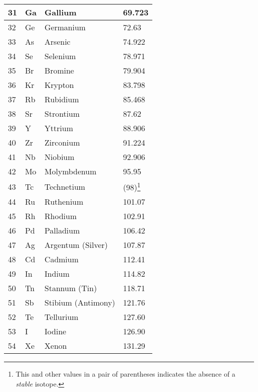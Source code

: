 \documentclass{article}
\begin{document}
\begin{center}
\begin{longtable}{|l|l|l|l|}
 \hline
    31 & Ga & \cellcolor{postblue}Gallium & 69.723\\
 \hline
    32 & Ge & \cellcolor{metalloid}Germanium & 72.63\\
 \hline
    33 & As & \cellcolor{metalloid}Arsenic & 74.922\\
 \hline
    34 & Se & \cellcolor{rnmgreen}Selenium & 78.971\\
 \hline
    35 & Br & \cellcolor{rnmgreen}Bromine & 79.904\\
 \hline
    36 & Kr &\cellcolor{noblepink}Krypton & 83.798\\
 \hline
 \hline
    37 & Rb & \cellcolor{alkalibeige}Rubidium & 85.468\\
 \hline
    38 & Sr & \cellcolor{alkalineyellow}Strontium & 87.62\\
 \hline
    39 & Y & \cellcolor{transred}Yttrium & 88.906\\
 \hline
    40 & Zr & \cellcolor{transred}Zirconium & 91.224\\
 \hline
    41 & Nb & \cellcolor{transred}Niobium & 92.906\\
 \hline
    42 & Mo & \cellcolor{transred}Molymbdenum & 95.95\\
 \hline
    43 & Tc & \cellcolor{transred}Technetium & (98)\footnote{This and other values in a pair of parentheses indicates the absence of a \emph{stable} isotope.}\\
 \hline
    44 & Ru & \cellcolor{transred}Ruthenium & 101.07\\
 \hline
    45 & Rh & \cellcolor{transred}Rhodium & 102.91\\
 \hline
    46 & Pd & \cellcolor{transred}Palladium & 106.42\\
 \hline
    47 & Ag & \cellcolor{transred}Argentum (Silver) & 107.87\\
 \hline
    48 & Cd & \cellcolor{transred}Cadmium & 112.41\\
 \hline
    49 & In & \cellcolor{postblue}Indium & 114.82\\
 \hline
    50 & Tn & \cellcolor{postblue}Stannum (Tin) & 118.71\\
 \hline
    51 & Sb & \cellcolor{metalloid}Stibium (Antimony) & 121.76\\
 \hline
    52 & Te & \cellcolor{metalloid}Tellurium & 127.60\\
 \hline
    53 & I & \cellcolor{rnmgreen}Iodine & 126.90\\
 \hline
    54 & Xe &\cellcolor{noblepink}Xenon & 131.29\\
 \hline
 \hline

\end{longtable}
\end{center}
\end{document}

